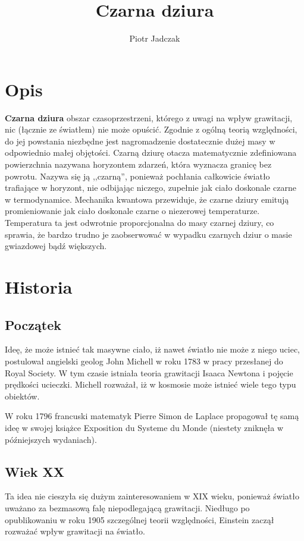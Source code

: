 \documentclass[12pt]{article}
\title{Czarna dziura}
\author{Piotr Jadczak}
\begin{document}
\maketitle
\section{Opis}

\textbf{Czarna dziura} \textendash{} obszar czasoprzestrzeni, kt\'{o}rego z uwagi na wp\l{}yw grawitacji, nic (\l{}\k{a}cznie ze \'{s}wiat\l{}em) nie mo\.{z}e opu\'{s}ci\'{c}. Zgodnie z og\'{o}ln\k{a} teori\k{a} wzgl\k{e}dno\'{s}ci, do jej powstania niezb\k{e}dne jest nagromadzenie dostatecznie du\.{z}ej masy w odpowiednio ma\l{}ej obj\k{e}to\'{s}ci. Czarn\k{a} dziur\k{e} otacza matematycznie zdefiniowana powierzchnia nazywana horyzontem zdarze\'{n}, kt\'{o}ra wyznacza granic\k{e} bez powrotu. Nazywa si\k{e} j\k{a} ,,czarn\k{a}\textquotedblright{}, poniewa\.{z} poch\l{}ania ca\l{}kowicie \'{s}wiat\l{}o trafiaj\k{a}ce w horyzont, nie odbijaj\k{a}c niczego, zupe\l{}nie jak cia\l{}o doskonale czarne w termodynamice. Mechanika kwantowa przewiduje, \.{z}e czarne dziury emituj\k{a} promieniowanie jak cia\l{}o doskonale czarne o niezerowej temperaturze. Temperatura ta jest odwrotnie proporcjonalna do masy czarnej dziury, co sprawia, \.{z}e bardzo trudno je zaobserwowa\'{c} w wypadku czarnych dziur o masie gwiazdowej b\k{a}d\'{z} wi\k{e}kszych.

\newpage
\section{Historia}
\subsection{Pocz\k{a}tek}
Ide\k{e}, \.{z}e mo\.{z}e istnie\'{c} tak masywne cia\l{}o, i\.{z} nawet \'{s}wiat\l{}o nie mo\.{z}e z niego uciec, postulowa\l{} angielski geolog John Michell w roku 1783 w pracy przes\l{}anej do Royal Society. W tym czasie istnia\l{}a teoria grawitacji Isaaca Newtona i poj\k{e}cie pr\k{e}dko\'{s}ci ucieczki. Michell rozwa\.{z}a\l{}, i\.{z} w kosmosie mo\.{z}e istnie\'{c} wiele tego typu obiekt\'{o}w.

W roku 1796 francuski matematyk Pierre Simon de Laplace propagowa\l{} t\k{e} sam\k{a} ide\k{e} w swojej ksi\k{a}\.{z}ce Exposition du Systeme du Monde (niestety znikn\k{e}\l{}a w p\'{o}\'{z}niejszych wydaniach).
\subsection{Wiek XX}
Ta idea nie cieszy\l{}a si\k{e} du\.{z}ym zainteresowaniem w XIX wieku, poniewa\.{z} \'{s}wiat\l{}o uwa\.{z}ano za bezmasow\k{a} fal\k{e} niepodlegaj\k{a}c\k{a} grawitacji. Nied\l{}ugo po opublikowaniu w roku 1905 szczeg\'{o}lnej teorii wzgl\k{e}dno\'{s}ci, Einstein zacz\k{a}\l{} rozwa\.{z}a\'{c} wp\l{}yw grawitacji na \'{s}wiat\l{}o.
\end{document}
